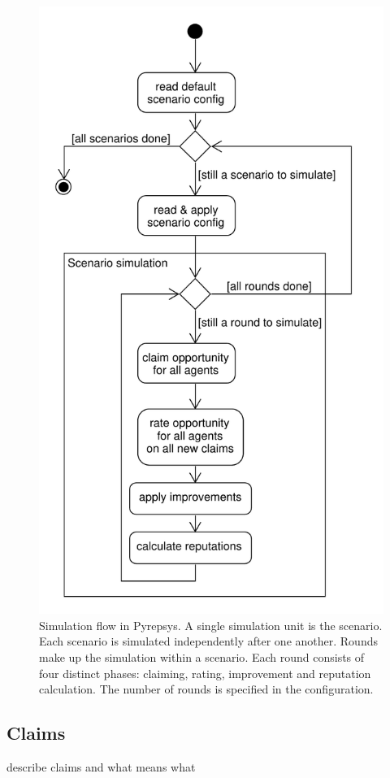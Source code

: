 \documentclass[%
    ]{\PathToTumTemplate/thesis/tum_thesis}
\begin{document}
\begin{figure}[]
  \begin{center}
        \includegraphics[width=0.75\linewidth]	{../uml/simulation_flow.pdf}
    \caption{
    Simulation flow in Pyrepsys.
    A single simulation unit is the \gls{scenario}.
    Each \gls{scenario} is simulated independently after one another.
    Rounds make up the simulation within a \gls{scenario}.
    Each round consists of four distinct phases: claiming, rating, improvement and reputation calculation.
    The number of rounds is specified in the configuration.
    }
    \label{fig:simulation_flow}
  \end{center}
\end{figure}


\subsection{Claims}
describe claims and what means what
\end{document}
